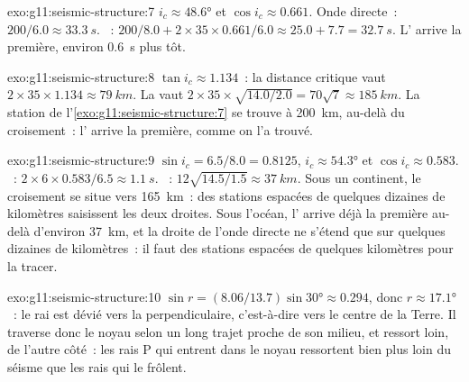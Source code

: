 \begin{solution}{exo:g11:seismic-structure:7}
$i_c \approx \ang{48.6}$ et $\cos i_c \approx 0.661$. Onde directe~: $200/6.0
\approx \qty{33.3}{s}$. ~: $200/8.0 + 2 \times 35 \times 0.661/6.0
\approx 25.0 + 7.7 = \qty{32.7}{s}$. L' arrive la première,
environ \qty{0.6}{s} plus tôt.
\end{solution}

\begin{solution}{exo:g11:seismic-structure:8}
$\tan i_c \approx 1.134$~: la distance critique vaut $2 \times 35 \times 1.134
\approx \qty{79}{km}$. La  vaut $2 \times 35 \times
\sqrt{14.0/2.0} = 70\sqrt 7 \approx \qty{185}{km}$. La station de
l'\cref{exo:g11:seismic-structure:7} se trouve à \qty{200}{km}, au-delà du
croisement~: l' arrive la première, comme on l'a trouvé.
\end{solution}

\begin{solution}{exo:g11:seismic-structure:9}
$\sin i_c = 6.5/8.0 = 0.8125$, $i_c \approx \ang{54.3}$ et $\cos i_c \approx
0.583$. ~: $2 \times 6 \times 0.583/6.5 \approx \qty{1.1}{s}$. ~: $12\sqrt{14.5/1.5} \approx \qty{37}{km}$. Sous un continent, le croisement se situe vers
\qty{165}{km}~: des stations espacées de quelques dizaines de kilomètres
saisissent les deux droites. Sous l'océan, l' arrive déjà la
première au-delà d'environ \qty{37}{km}, et la droite de l'onde directe ne
s'étend que sur quelques dizaines de kilomètres~: il faut des stations
espacées de quelques kilomètres pour la tracer.
\end{solution}

\begin{solution}{exo:g11:seismic-structure:10}
$\sin r = (8.06/13.7)\sin\ang{30} \approx 0.294$, donc $r \approx \ang{17.1}$~:
le rai est dévié vers la perpendiculaire, c'est-à-dire vers le centre de la
Terre. Il traverse donc le noyau selon un long trajet proche de son milieu,
et ressort loin, de l'autre côté~: les rais P qui entrent dans le noyau
ressortent bien plus loin du séisme que les rais qui le frôlent.
\end{solution}

